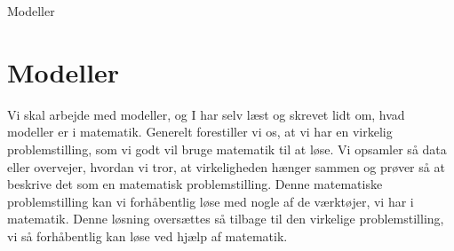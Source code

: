 \begin{center}
\Huge
Modeller
\end{center}
\section*{Modeller}

Vi skal arbejde med modeller, og I har selv læst og skrevet lidt om, hvad modeller er i matematik. Generelt forestiller vi os, at vi har en virkelig problemstilling, som vi godt vil bruge matematik til at løse. Vi opsamler så data eller overvejer, hvordan vi tror, at virkeligheden hænger sammen og prøver så at beskrive det som en matematisk problemstilling. Denne matematiske problemstilling kan vi forhåbentlig løse med nogle af de værktøjer, vi har i matematik. Denne løsning oversættes så tilbage til den virkelige problemstilling, vi så forhåbentlig kan løse ved hjælp af matematik. 


